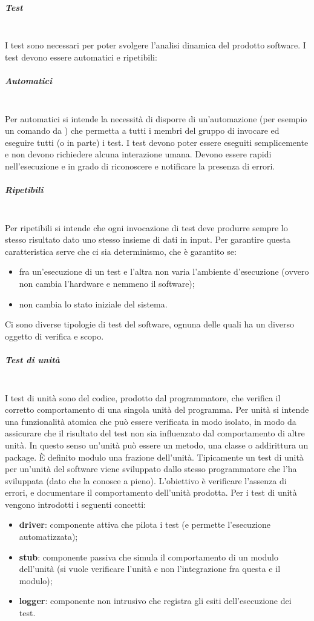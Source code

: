 \subparagraph{Test} \mbox{}\\
I test sono necessari per poter svolgere l'analisi dinamica del prodotto software.
I test devono essere automatici e ripetibili:
\subparagraph*{Automatici} \mbox{}\\ 
Per automatici si intende la necessità di disporre di un'automazione (per esempio un comando da ) che permetta a tutti i membri del gruppo di invocare ed eseguire tutti (o in parte) i test.
I test devono poter essere eseguiti semplicemente e non devono richiedere alcuna interazione umana.
Devono essere rapidi nell’esecuzione e in grado di riconoscere e notificare la presenza di errori.
\subparagraph*{Ripetibili} \mbox{}\\
Per ripetibili si intende che ogni invocazione di test deve produrre sempre lo stesso risultato dato uno stesso insieme di dati in input.
Per garantire questa caratteristica serve che ci sia determinismo, che è garantito se:
\begin{itemize}
    \item fra un'esecuzione di un test e l'altra non varia l'ambiente d'esecuzione (ovvero non cambia l'hardware e nemmeno il software);
    \item non cambia lo stato iniziale del sistema.
\end{itemize}

Ci sono diverse tipologie di test del software, ognuna delle quali ha un diverso oggetto di verifica e scopo.

\subparagraph{Test di unità} \mbox{}\\
I test di unità sono del codice, prodotto dal programmatore, che verifica il corretto comportamento di una singola unità del programma.
Per unità si intende una funzionalità atomica che può essere verificata in modo isolato, in modo da assicurare che il risultato del test non sia influenzato dal comportamento di altre unità. In questo senso un'unità può essere un metodo, una classe o addirittura un package.
È definito modulo una frazione dell'unità.
Tipicamente un test di unità per un'unità del software viene sviluppato dallo stesso programmatore che l'ha sviluppata (dato che la conosce a pieno).
L'obiettivo è verificare l’assenza di errori, e documentare il comportamento dell’unità prodotta.
Per i test di unità vengono introdotti i seguenti concetti:
\begin{itemize}
    \item \textbf{driver}: componente attiva che pilota i test (e permette l'esecuzione automatizzata);
    \item \textbf{stub}: componente passiva che simula il comportamento di un modulo dell'unità (si vuole verificare l'unità e non l'integrazione fra questa e il modulo);
    \item \textbf{logger}: componente non intrusivo che registra gli esiti dell'esecuzione dei test.
\end{itemize}

